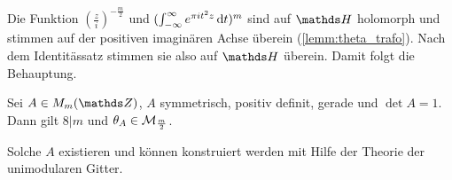 \begin{bewe}
Die Funktion $(\frac{z}{i})^{-\frac{m}{2}}$ und $(\int_{-\infty}^\infty e^{\pi i t^2 z} \,\mathrm{d} t)^m$ sind auf $\HH$ holomorph und stimmen auf der positiven imaginären Achse überein (\autoref{lemm:theta_trafo}).
Nach dem Identitässatz stimmen sie also auf $\HH$ überein.
Damit folgt die Behauptung.
\end{bewe}

\begin{satz}\label{satz:theta_modulform}
Sei $A \in M_m(\ZZ)$, $A$ symmetrisch, positiv definit, gerade und $\det A = 1$.
Dann gilt $8 | m$ und $\theta_A \in \mathcal{M}_{\frac{m}{2}}$.
\end{satz}
\begin{beme}
Solche $A$ existieren und können konstruiert werden mit Hilfe der Theorie der unimodularen Gitter.
\end{beme}

